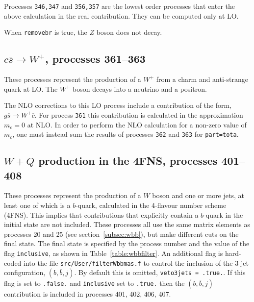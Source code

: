 \documentclass[12pt]{article}
\begin{document}
Processes {\tt 346,347} and {\tt 356,357} are the lowest order processes that enter
the above calculation in the real contribution. They can be computed only at LO.

When {\tt removebr} is true, the $Z$ boson does not decay.

\subsection{$c \overline s \to W^+$, processes 361--363}
\label{subsec:csbar}
These processes represent the production of a $W^+$ from a charm and anti-strange
quark at LO. The $W^+$ boson decays into a neutrino and a positron.

The NLO corrections to this LO process include a contribution of the form,
$g\overline s \to W^+ \overline c$. For process {\tt 361} this contribution is
calculated in the approximation $m_c=0$ at NLO. In order to perform the NLO calculation 
for a non-zero value of $m_c$, one must instead sum the results of processes {\tt 362}
and {\tt 363} for {\tt part=tota}.

\subsection{$W+Q$ production in the 4FNS, processes 401--408}
\label{subsec:wbbfilter}
These processes represent the production of a $W$ boson and one or more jets,
at least one of which is a $b$-quark, calculated in the 4-flavour number scheme (4FNS). 
This implies that contributions that explicitly contain a $b$-quark in the initial state
are not included.
These processes all use the same matrix
elements as processes 20 and 25 (see section~\ref{subsec:wbb}), but make different
cuts on the final state. The final state is specified by the process number and
the value of the flag {\tt inclusive}, as shown in Table~\ref{table:wbbfilter}.
An additional flag is hard-coded into the file {\tt src/User/filterWbbmas.f} to control
the inclusion of the 3-jet configuration, $(b,\overline b,j)$. By default this is
omitted, {\tt veto3jets = .true.}. If this flag is set to {\tt .false.} and
{\tt inclusive} set to {\tt .true.} then the $(b,\overline b,j)$ contribution
is included in processes 401, 402, 406, 407.
\end{document}
